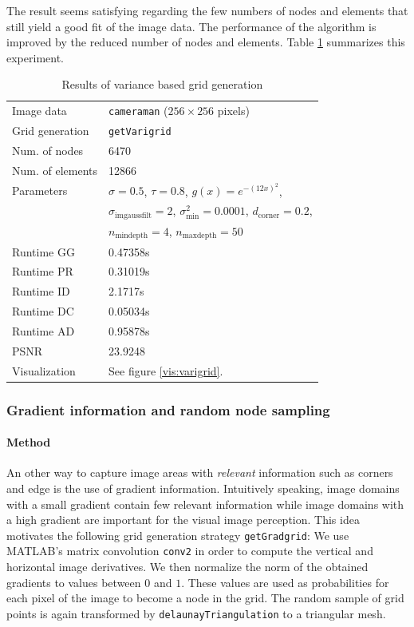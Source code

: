 \documentclass{report}
\begin{document}
The result seems satisfying regarding the few numbers of nodes and elements that still yield a good fit of the image data. The performance of the algorithm is improved by the reduced number of nodes and elements. Table \ref{res:varigrid} summarizes this experiment.

\begin{table}[h]
	\centering
	\begin{tabular}{|ll}
		Image data & \texttt{cameraman} ($256 \times 256$ pixels)\\
		Grid generation & \texttt{getVarigrid} \\
		Num. of nodes & 6470 \\
		Num. of elements & 12866 \\
		Parameters & $\sigma=0.5$, $\tau=0.8$, $g(x) = e^{-(12 x)^2}$, \\
		& $\sigma_\text{imgaussfilt}=2$, $\sigma^2_\text{min}=0.0001$, $d_\text{corner}=0.2$, \\
		& $n_\text{mindepth}=4$, $n_\text{maxdepth}=50$ \\
		Runtime GG & 0.47358s \\
		Runtime PR & 0.31019s \\
		Runtime ID & 2.1717s \\
		Runtime DC & 0.05034s \\
		Runtime AD & 0.95878s \\
		PSNR & 23.9248 \\
		Visualization & See figure \ref{vis:varigrid}. \\
	\end{tabular}
	\caption{Results of variance based grid generation}
	\label{res:varigrid}
\end{table}

\subsubsection{Gradient information and random node sampling}

\paragraph{Method}

An other way to capture image areas with \emph{relevant} information such as corners and edge is the use of gradient information. Intuitively speaking, image domains with a small gradient contain few relevant information while image domains with a high gradient are important for the visual image perception. This idea motivates the following grid generation strategy \texttt{getGradgrid}: We use MATLAB's matrix convolution \texttt{conv2} in order to compute the vertical and horizontal image derivatives. We then normalize the norm of the obtained gradients to values between $0$ and $1$. These values are used as probabilities for each pixel of the image to become a node in the grid. The random sample of grid points is again transformed by \texttt{delaunayTriangulation} to a triangular mesh.
\end{document}
